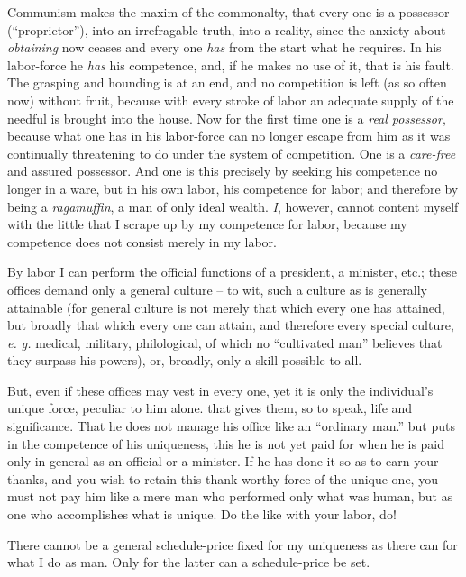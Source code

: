 \documentclass[12pt,a4paper]{book}
\begin{document}
Communism makes the maxim of the commonalty, that every one is a possessor 
(``proprietor''), into an irrefragable truth, into a reality, since the 
anxiety about \textit{obtaining} now ceases and every one \textit{has} from 
the start what he requires. In his labor-force he \textit{has} his competence, 
and, if he makes no use of it, that is his fault. The grasping and hounding is 
at an end, and no competition is left (as so often now) without fruit, because 
with every stroke of labor an adequate supply of the needful is brought into 
the house. Now for the first time one is a \textit{real possessor}, because 
what one has in his labor-force can no longer escape from him as it was 
continually threatening to do under the system of competition. One is a 
\textit{care-free} and assured possessor. And one is this precisely by seeking 
his competence no longer in a ware, but in his own labor, his competence for 
labor; and therefore by being a \textit{ragamuffin}, a man of only ideal 
wealth. \textit{I}, however, cannot content myself with the little that I 
scrape up by my competence for labor, because my competence does not consist 
merely in my labor.

By labor I can perform the official functions of a president, a minister, 
etc.; these offices demand only a general culture -- to wit, such a culture as 
is generally attainable (for general culture is not merely that which every 
one has attained, but broadly that which every one can attain, and therefore 
every special culture, \textit{e. g.} medical, military, philological, of 
which no ``cultivated man'' believes that they surpass his powers), or, 
broadly, only a skill possible to all.

But, even if these offices may vest in every one, yet it is only the 
individual's unique force, peculiar to him alone. that gives them, so to 
speak, life and significance. That he does not manage his office like an 
``ordinary man.'' but puts in the competence of his uniqueness, this he is 
not yet paid for when he is paid only in general as an official or a minister. 
If he has done it so as to earn your thanks, and you wish to retain this 
thank-worthy force of the unique one, you must not pay him like a mere man who 
performed only what was human, but as one who accomplishes what is unique. Do 
the like with your labor, do!

There cannot be a general schedule-price fixed for my uniqueness as there can 
for what I do as man. Only for the latter can a schedule-price be set.
\end{document}
